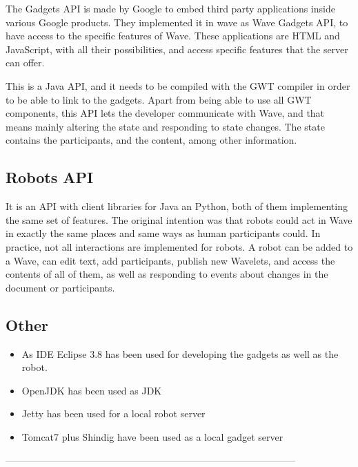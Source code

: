 The Gadgets API is made by Google to embed third party applications inside various Google products. They implemented it in wave as Wave Gadgets API, to have access to the specific features of Wave. These applications are HTML and JavaScript, with all their possibilities, and access specific features that the server can offer.

This is a Java API, and it needs to be compiled with the GWT compiler in order to be able to link to the gadgets. Apart from being able to use all GWT components, this API lets the developer communicate with Wave, and that means mainly altering the state and responding to state changes. The state contains the participants, and the content, among other information. 


\subsection{Robots API}

It is an API with client libraries for Java an Python, both of them implementing the same set of features. The original intention was that robots could act in Wave in exactly the same places and same ways as human participants could. In practice, not all interactions are implemented for robots. A robot can be added to a Wave, can edit text, add participants, publish new Wavelets, and access the contents of all of them, as well as responding to events about changes in the document or participants.


\subsection{Other}

\begin{itemize}
  \item As IDE Eclipse 3.8 has been used for developing the gadgets as well as the robot.
  \item OpenJDK has been used as JDK
  \item Jetty has been used for a local robot server
  \item Tomcat7 plus Shindig have been used as a local gadget server 
\end{itemize}


\begin{center}
------------------------------------------------------------------------------------------\\
\end{center}

